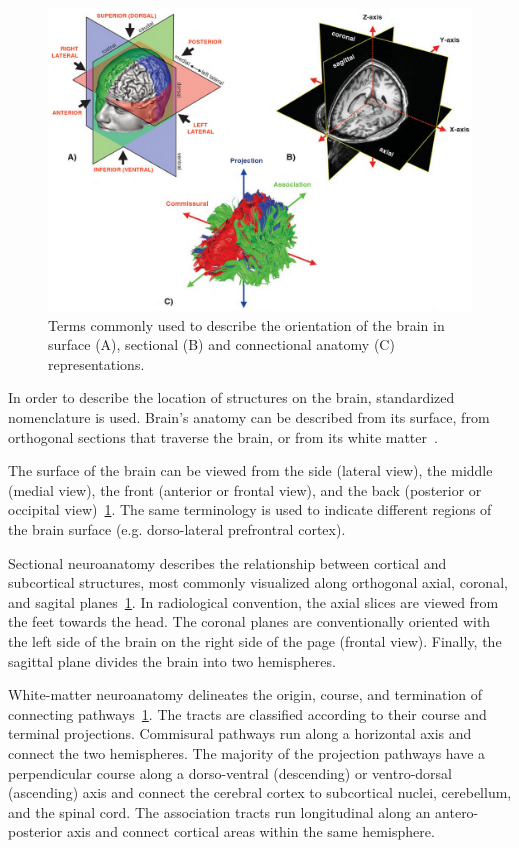 \begin{figure}[t]
    \includegraphics[width=\textwidth]{2.neuroanatomy/img/terminology.png}
    \caption{Terms commonly used to describe the orientation of the brain in surface (A), sectional (B) and connectional anatomy (C) representations.}
    \label{fig:anatomy_terminology}
\end{figure}

In order to describe the location of structures on the brain, standardized
nomenclature is used. Brain's anatomy can be described from its surface,
from orthogonal sections that traverse the brain, or from its white matter~\cite{Catani2012}.

The surface of the brain can be viewed from the side (lateral view),
the middle (medial view), the front (anterior or frontal view), and the back
(posterior or occipital view)~\ref{fig:anatomy_terminology}. The same terminology
is used to indicate different regions of the brain surface (e.g. dorso-lateral prefrontral cortex).

Sectional neuroanatomy describes the relationship between cortical and
subcortical structures, most commonly visualized along orthogonal axial,
coronal, and sagital planes~\ref{fig:anatomy_terminology}. In radiological
convention, the axial slices are viewed from the feet towards the head.
The coronal planes are conventionally oriented with the left side of the brain
on the right side of the page (frontal view). Finally, the sagittal plane 
divides the brain into two hemispheres.

White-matter neuroanatomy delineates the origin, course, and termination of
connecting pathways~\ref{fig:anatomy_terminology}. The tracts are classified
according to their course and terminal projections. Commisural pathways run
along a horizontal axis and connect the two hemispheres. The majority of the
projection pathways have a perpendicular course along a dorso-ventral
(descending) or ventro-dorsal (ascending) axis and connect the cerebral
cortex to subcortical nuclei, cerebellum, and the spinal cord. The association
tracts run longitudinal along an antero-posterior axis and connect cortical 
areas within the same hemisphere.

